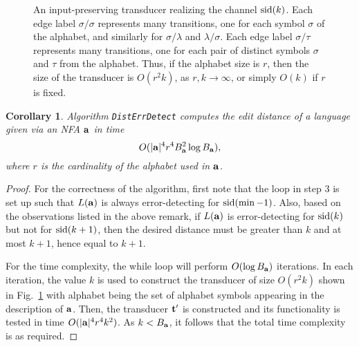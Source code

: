 \documentclass{article}
\theoremstyle{plain}
\newtheorem{corollary}[theorem]{Corollary}
\theoremstyle{definition}
\theoremstyle{remark}
\newcommand\db{B}             \newcommand\dbold{D}   \newcommand\pssi{\par\smallskip\indent}
\newcommand\pnsi{\par\indent}
\begin{document}
\begin{figure}[ht]
\centering
{}
\parbox{4.3in}{\caption{An input-preserving transducer realizing the channel $\mathrm{sid}(k)$. Each edge label $\sigma/\sigma$ represents many transitions, one for each symbol $\sigma$ of the alphabet, and similarly for $\sigma/\lambda$ and $\lambda/\sigma$. Each edge label $\sigma/\tau$ represents
many transitions, one for each pair of distinct symbols
$\sigma$ and $\tau$ from the alphabet. Thus, if the alphabet size is $r$, then the size of the transducer is $O(r^2k)$, as $r,k\to\infty$, or simply $O(k)$ if $r$ is fixed.}\label{fig:inprestrans}}
\end{figure}


\begin{corollary}\label{th:ed}
Algorithm \texttt{DistErrDetect} computes the
edit distance of a language given via an NFA $\mathbf{a}$ in time $$O(\sz{\aut}^4r^4\db_{\aut}^2\log\db_{\aut}),$$
where $r$ is the cardinality of the alphabet used in $\mathbf{a}$.
\end{corollary}
\begin{proof}
For the correctness of the algorithm, first note that the loop in step 3 is set up such that $L(\mathbf{a})$
is always error-detecting for $\mathrm{sid}(\min-1)$. Also, based on the observations listed in the above remark, if $L(\mathbf{a})$ is error-detecting for $\mathrm{sid}(k)$ but not for
$\mathrm{sid}(k+1)$, then the desired distance
must be greater than $k$ and at most $k+1$, hence equal
to $k+1$.
\pnsi
For the time complexity, the while loop will
perform $O(\log {\db_\aut})$ iterations. In each
iteration, the value $k$ is
used to construct the transducer of
size $O(r^2k)$ shown in Fig.~\ref{fig:inprestrans} with alphabet
being the set of alphabet symbols appearing
in the description of $\mathbf{a}$. Then, the transducer
$\mathbf{t}'$ is constructed and its functionality
is tested in time $O(|\mathbf{a}|^4r^4k^2)$.
As $k<{\db_\aut}$, it follows that the total time complexity is
as required.
\end{proof}
\end{document}
